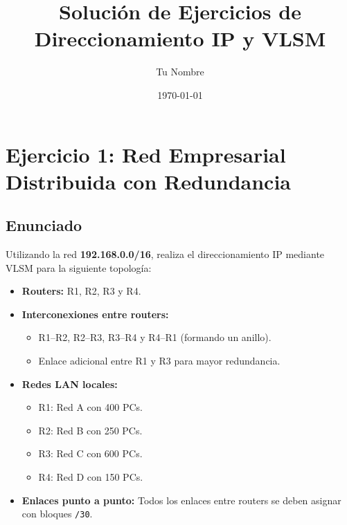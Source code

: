 \documentclass[a4paper,12pt]{article}
\title{Solución de Ejercicios de Direccionamiento IP y VLSM}
\author{Tu Nombre}
\date{\today}
\begin{document}
\maketitle

\section{Ejercicio 1: Red Empresarial Distribuida con Redundancia}

\subsection{Enunciado}
Utilizando la red \textbf{192.168.0.0/16}, realiza el direccionamiento IP mediante VLSM para la siguiente topología:
\begin{itemize}
  \item \textbf{Routers:} R1, R2, R3 y R4.
  \item \textbf{Interconexiones entre routers:}  
    \begin{itemize}
      \item R1--R2, R2--R3, R3--R4 y R4--R1 (formando un anillo).
      \item Enlace adicional entre R1 y R3 para mayor redundancia.
    \end{itemize}
  \item \textbf{Redes LAN locales:}
    \begin{itemize}
      \item R1: Red A con 400 PCs.
      \item R2: Red B con 250 PCs.
      \item R3: Red C con 600 PCs.
      \item R4: Red D con 150 PCs.
    \end{itemize}
  \item \textbf{Enlaces punto a punto:} Todos los enlaces entre routers se deben asignar con bloques \texttt{/30}.
\end{itemize}
\end{document}

